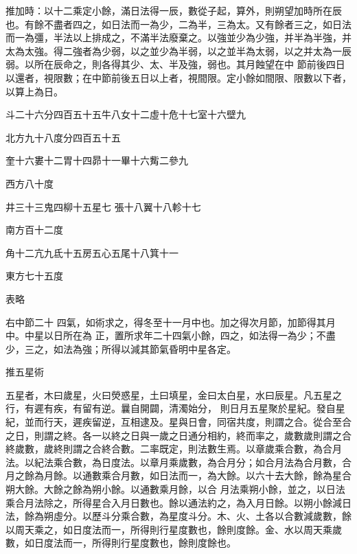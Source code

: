 \begin{pinyinscope}
 推加時：以十二乘定小餘，滿日法得一辰，數從子起，算外，則朔望加時所在辰也。有餘不盡者四之，如日法而一為少，二為半，三為太。又有餘者三之，如日法而一為彊，半法以上排成之，不滿半法廢棄之。以強並少為少強，并半為半強，并太為太強。得二強者為少弱，以之並少為半弱，以之並半為太弱，以之并太為一辰弱。以所在辰命之，則各得其少、太、半及強，弱也。其月蝕望在中
 節前後四日以還者，視限數；在中節前後五日以上者，視間限。定小餘如間限、限數以下者，以算上為日。



 斗二十六分四百五十五牛八女十二虛十危十七室十六壁九



 北方九十八度分四百五十五



 奎十六婁十二胃十四昴十一畢十六觜二參九



 西方八十度



 井三十三鬼四柳十五星七
 張十八翼十八軫十七



 南方百十二度



 角十二亢九氐十五房五心五尾十八箕十一



 東方七十五度



 表略



 右中節二十
 四氣，如術求之，得冬至十一月中也。加之得次月節，加節得其月中。中星以日所在為
 正，置所求年二十四氣小餘，四之，如法得一為少；不盡少，三之，如法為強；所得以減其節氣昏明中星各定。



 推五星術



 五星者，木曰歲星，火曰熒惑星，土曰填星，金曰太白星，水曰辰星。凡五星之行，有遲有疾，有留有逆。曩自開闢，清濁始分，
 則日月五星聚於星紀。發自星紀，並而行天，遲疾留逆，互相逮及。星與日會，同宿共度，則謂之合。從合至合之日，則謂之終。各一以終之日與一歲之日通分相約，終而率之，歲數歲則謂之合終歲數，歲終則謂之合終合數。二率既定，則法數生焉。以章歲乘合數，為合月法。以紀法乘合數，為日度法。以章月乘歲數，為合月分；如合月法為合月數，合月之餘為月餘。以通數乘合月數，如日法而一，為大餘。以六十去大餘，餘為星合朔大餘。大餘之餘為朔小餘。以通數乘月餘，以合
 月法乘朔小餘，並之，以日法乘合月法除之，所得星合入月日數也。餘以通法約之，為入月日餘。以朔小餘減日法，餘為朔虛分。以歷斗分乘合數，為星度斗分。木、火、土各以合數減歲數，餘以周天乘之，如日度法而一，所得則行星度數也，餘則度餘。金、水以周天乘歲數，如日度法而一，所得則行星度數也，餘則度餘也。




\end{pinyinscope}
